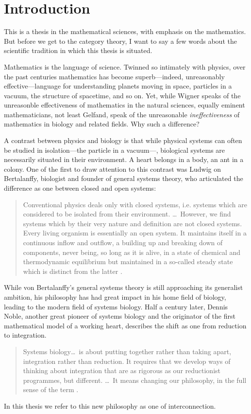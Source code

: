 {}
\chapter*{Introduction}

This is a thesis in the mathematical sciences, with emphasis on the mathematics.
But before we get to the category theory, I want to say a few words about the
scientific tradition in which this thesis is situated.

Mathematics is the language of science. Twinned so intimately with physics, over
the past centuries mathematics has become superb---indeed, unreasonably
effective---language for understanding planets moving in space, particles in a
vacuum, the structure of spacetime, and so on.  Yet, while Wigner speaks of the
unreasonble effectiveness of mathematics in the natural sciences, equally
eminent mathematicians, not least Gelfand, speak of the unreasonable
\emph{ineffectiveness} of mathematics in biology and related fields. Why such a
difference?

A contrast between physics and biology is that while physical systems can often
be studied in isolation---the particle in a vacuum---, biological systems are
necessarily situated in their environment. A heart belongs in a body, an ant in
a colony. One of the first to draw attention to this contrast was Ludwig on
Bertalanffy, biologist and founder of general systems theory, who articulated
the difference as one between closed and open systems: 
\begin{quote}
  Conventional physics deals only with closed systems, i.e. systems which are
  considered to be isolated from their environment. \dots\ However, we find
  systems which by their very nature and definition are not closed systems.
  Every living organism is essentially an open system. It maintains itself in a
  continuous inflow and outflow, a building up and breaking down of components,
  never being, so long as it is alive, in a state of chemical and thermodynamic
  equilibrium but maintained in a so-called steady state which is distinct from
  the latter \cite{Ber68}.
\end{quote}
While von Bertalanffy's general systems theory is still approaching its
generalist ambition, his philosophy has had great impact in his home field of
biology, leading to the modern field of systems biology. Half a century later,
Dennis Noble, another great pioneer of systems biology and the originator of the
first mathematical model of a working heart, describes the shift as one from
reduction to integration.
\begin{quotation}
  Systems biology\dots\ is about putting together rather than taking apart,
  integration rather than reduction. It requires that we develop ways of
  thinking about integration that are as rigorous as our reductionist
  programmes, but different. \dots\ It means changing our philosophy, in the full
  sense of the term \cite{Nob06}.
\end{quotation}
In this thesis we refer to this new philosophy as one of interconnection.

